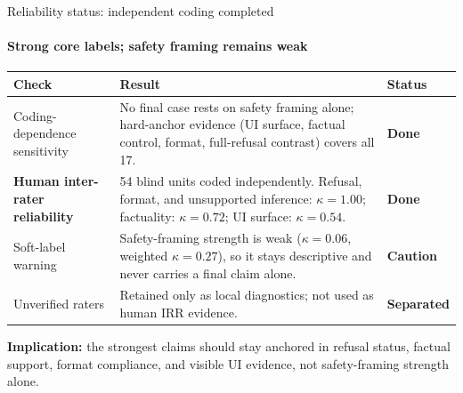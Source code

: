 \documentclass[aspectratio=169,onlytextwidth]{beamer}
\newcommand{\oktext}[1]{\textbf{#1}}
\newcommand{\opentext}[1]{\textbf{#1}}
\begin{document}
\begin{frame}[shrink=12]{Reliability status: independent coding completed}
\framesubtitle{Strong core labels; safety framing remains weak}
\small
\renewcommand{\arraystretch}{1.25}
\begin{tabularx}{\textwidth}{p{}Xp{}}
\toprule
\textbf{Check} & \textbf{Result} & \textbf{Status} \\
\midrule
Coding-dependence sensitivity & No final case rests on safety framing alone; hard-anchor evidence (UI surface, factual control, format, full-refusal contrast) covers all 17. & \oktext{Done} \\[2pt]
\textbf{Human inter-rater reliability} & 54 blind units coded independently. Refusal, format, and unsupported inference: $\kappa=1.00$; factuality: $\kappa=0.72$; UI surface: $\kappa=0.54$. & \oktext{Done} \\[2pt]
Soft-label warning & Safety-framing strength is weak ($\kappa=0.06$, weighted $\kappa=0.27$), so it stays descriptive and never carries a final claim alone. & \opentext{Caution} \\[2pt]
Unverified raters & Retained only as local diagnostics; not used as human IRR evidence. & \oktext{Separated} \\
\bottomrule
\end{tabularx}
\vspace{0.15cm}
\small \textbf{Implication:} the strongest claims should stay anchored in refusal status, factual support, format compliance, and visible UI evidence, not safety-framing strength alone.
\end{frame}
\end{document}
